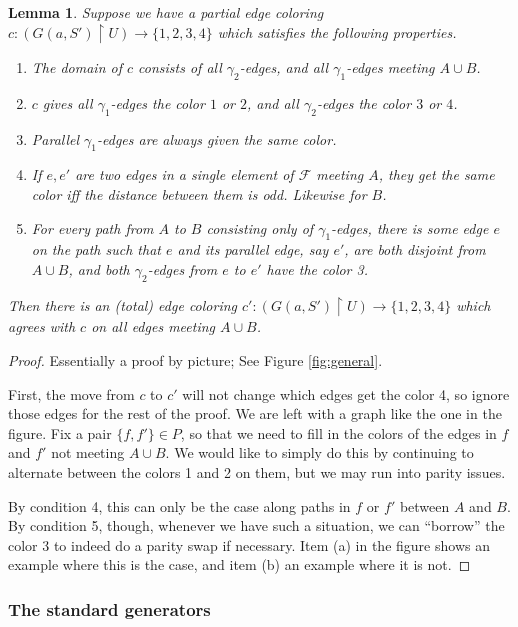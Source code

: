 \documentclass[12pt]{article}
\newcommand{\0}{\varnothing}
\newcommand{\F}{\mathcal{F}}
\newcommand{\res}{\upharpoonright}
\newtheorem{lemma}{Lemma}
\begin{document}
\begin{lemma}\label{lem:general}
Suppose we have a partial edge coloring $c:(G(a,S') \res U) \rightarrow \{1,2,3,4\}$ which satisfies the following properties. 
\begin{enumerate}
    \item The domain of $c$ consists of all $\gamma_2$-edges, and all $\gamma_1$-edges meeting $A \cup B$.
    \item $c$ gives all $\gamma_1$-edges the color $1$ or $2$, and all $\gamma_2$-edges the color $3$ or $4$.
    \item Parallel $\gamma_1$-edges are always given the same color.
    \item If $e,e'$ are two edges in a single element of $\F$ meeting $A$, they get the same color iff the distance between them is odd. Likewise for $B$.
    \item For every path from $A$ to $B$ consisting only of $\gamma_1$-edges, there is some edge $e$ on the path such that $e$ and its parallel edge, say $e'$, are both disjoint from $A \cup B$, and both $\gamma_2$-edges from $e$ to $e'$ have the color 3.  
\end{enumerate}
Then there is an (total) edge coloring $c':(G(a,S') \res U) \rightarrow \{1,2,3,4\}$ which agrees with $c$ on all edges meeting $A \cup B$.
\end{lemma}

\begin{proof}
Essentially a proof by picture; See Figure \ref{fig:general}. 

First, the move from $c$ to $c'$ will not change which edges get the color 4, so ignore those edges for the rest of the proof. We are left with a graph like the one in the figure. Fix a pair $\{f,f'\} \in P$, so that we need to fill in the colors of the edges in $f$ and $f'$ not meeting $A \cup B$. We would like to simply do this by continuing to alternate between the colors 1 and 2 on them, but we may run into parity issues.

By condition 4, this can only be the case along paths in $f$ or $f'$ between $A$ and $B$. By condition 5, though, whenever we have such a situation, we can ``borrow'' the color 3 to indeed do a parity swap if necessary. Item (a) in the figure shows an example where this is the case, and item (b) an example where it is not. 
\end{proof}

\subsubsection{The standard generators}
\end{document}
